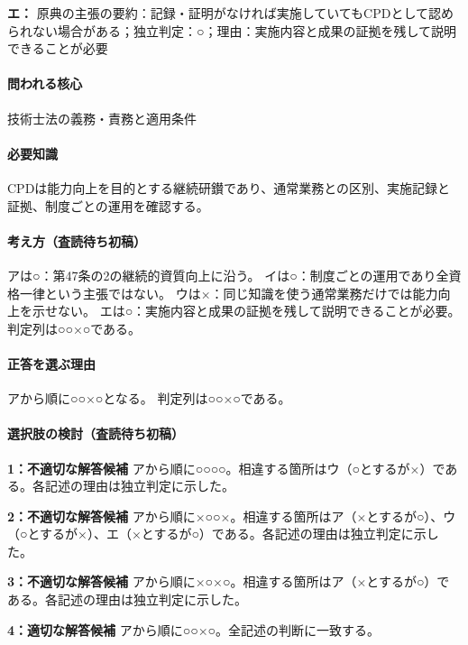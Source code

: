 \noindent\textbf{エ：} 原典の主張の要約：記録・証明がなければ実施していてもCPDとして認められない場合がある；独立判定：○；理由：実施内容と成果の証拠を残して説明できることが必要\par

\paragraph{問われる核心} 技術士法の義務・責務と適用条件

\paragraph{必要知識} CPDは能力向上を目的とする継続研鑚であり、通常業務との区別、実施記録と証拠、制度ごとの運用を確認する。

\paragraph{考え方（査読待ち初稿）} アは○：第47条の2の継続的資質向上に沿う。 イは○：制度ごとの運用であり全資格一律という主張ではない。 ウは×：同じ知識を使う通常業務だけでは能力向上を示せない。 エは○：実施内容と成果の証拠を残して説明できることが必要。 判定列は○○×○である。

\paragraph{正答を選ぶ理由} アから順に○○×○となる。  判定列は○○×○である。

\paragraph{選択肢の検討（査読待ち初稿）}\mbox{}\par

\noindent\textbf{1：不適切な解答候補} アから順に○○○○。相違する箇所はウ（○とするが×）である。各記述の理由は独立判定に示した。\par

\noindent\textbf{2：不適切な解答候補} アから順に×○○×。相違する箇所はア（×とするが○）、ウ（○とするが×）、エ（×とするが○）である。各記述の理由は独立判定に示した。\par

\noindent\textbf{3：不適切な解答候補} アから順に×○×○。相違する箇所はア（×とするが○）である。各記述の理由は独立判定に示した。\par

\noindent\textbf{4：適切な解答候補} アから順に○○×○。全記述の判断に一致する。\par

